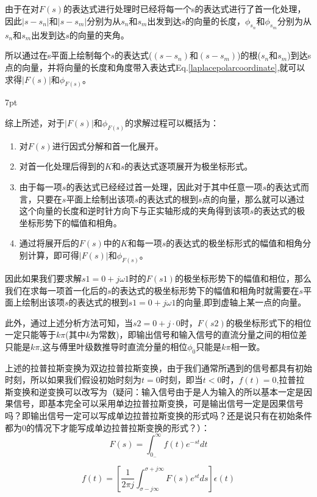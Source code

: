 \documentclass{article}
\numberwithin{equation}{section}
\numberwithin{figure}{section}
\newenvironment{formal}{%
\def\FrameCommand{%
\hspace{1pt}%
{\color{DarkBlue}\vrule width 2pt}%
{\color{formalshade}\vrule width 4pt}%
\colorbox{formalshade}%
}%
\MakeFramed{\advance\hsize-\width\FrameRestore}%
\noindent\hspace{-4.55pt}%
\begin{adjustwidth}{}{7pt}%
\vspace{2pt}\vspace{2pt}%
}
{%
\vspace{2pt}\end{adjustwidth}\endMakeFramed%
}
\begin{document}
由于在对$F(s)$的表达式进行处理时已经将每一个s的表达式进行了首一化处理，因此$|s-s_n|$和$|s-s_m|$分别为从$s_n$和$s_m$出发到达$s$的向量的长度，$\phi_{s_n}$和$\phi_{s_m}$分别为从$s_n$和$s_m$出发到达$s$的向量的夹角。

所以通过在s平面上绘制每个$s$的表达式($(s-s_n)$和$(s-s_m)$)的根($s_n$和$s_m$)到达s点的向量，并将向量的长度和角度带入表达式Eq.\ref{laplacepolarcoordinate},就可以求得$|F(s)|$和$\phi_{F(s)}$。

\begin{formal}
    综上所述，对于$|F(s)|$和$\phi_{F(s)}$的求解过程可以概括为：
\begin{enumerate}
    \item 对$F(s)$进行因式分解和首一化展开。
    \item 对首一化处理后得到的$K$和$s$的表达式逐项展开为极坐标形式。
    \item 由于每一项$s$的表达式已经经过首一处理，因此对于其中任意一项$s$的表达式而言，只要在$s$平面上绘制出该项$s$的表达式的根到$s$点的向量，那么就可以通过这个向量的长度和逆时针方向下与正实轴形成的夹角得到该项$s$的表达式的极坐标形势下的幅值和相角。
    \item 通过将展开后的$F(s)$中的$K$和每一项$s$的表达式的极坐标形式的幅值和相角分别计算，即可得$|F(s)|$和$\phi_{F(s)}$。
\end{enumerate}
\end{formal}

因此如果我们要求解$s1=0+j\omega1$时的$F(s1)$的极坐标形势下的幅值和相位，那么我们在求每一项首一化后的$s$的表达式的极坐标形势下的幅值和相角时就需要在$s$平面上绘制出该项$s$的表达式的根到$s1=0+j\omega1$的向量,即到虚轴上某一点的向量。

此外，通过上述分析方法可知，当$s2=0+j·0$时，$F(s2)$的极坐标形式下的相位一定只能等于$k\pi$(其中$k$为常数)，即输出信号和输入信号的直流分量之间的相位差只能是$k\pi$,这与傅里叶级数推导时直流分量的相位$\phi_0$只能是$k\pi$相一致。

上述的拉普拉斯变换为双边拉普拉斯变换，由于我们通常所遇到的信号都具有初始时刻，所以如果我们假设初始时刻为$t=0$时刻，即当$t<0$时，$f(t)=0$,拉普拉斯变换和逆变换可以改写为（疑问：输入信号由于是人为输入的所以基本一定是因果信号，即基本完全可以采用单边拉普拉斯变换，可是输出信号一定是因果信号吗？即输出信号一定可以写成单边拉普拉斯变换的形式吗？还是说只有在初始条件都为0的情况下才能写成单边拉普拉斯变换的形式？）：
\begin{equation}
        F(s)=\int_{0_-}^{\infty}f(t)e^{-st}dt
\end{equation}

\begin{equation}
    f(t)=[\frac{1}{2\pi j}\int_{\sigma-j\infty}^{\sigma+j\infty}F(s)e^{st}ds]\epsilon(t)
\end{equation}
\end{document}
